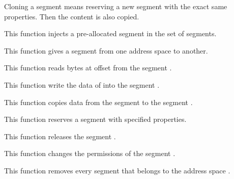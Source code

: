 \begin{itemize}
{               Cloning a segment means reserving a new segment with the
               exact same properties. Then the content is also copied.
             }

	     {
	       This function injects a pre-allocated segment in the set of
	       segments.
	     }

	     {
	       This function gives a segment from one address space to another.
	     }

             {
               This function reads  bytes at offset
                from the segment .
             }

              {
		This function write the data of  into the
		segment .
              }

             {
               This function copies data from the segment  to
               the segment .
             }

             {
               This function reserves a segment with specified properties.
             }

             {
               This function releases the segment .
             }

             {
               This function changes the permissions of the segment .
             }

              {
		This function removes every segment that belongs to the
		address space .
              }


\end{itemize}
